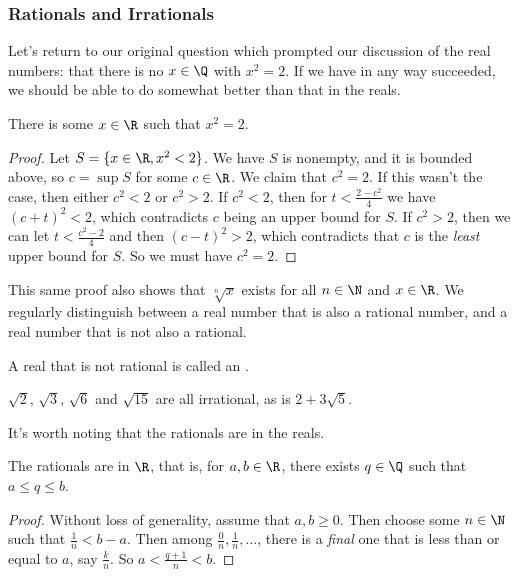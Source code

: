 \subsubsection{Rationals and Irrationals}

Let's return to our original question which prompted our discussion of the real numbers: that there is no $x \in \Q$ with $x^2 = 2$. If we have in any way succeeded, we should be able to do somewhat better than that in the reals. 

\begin{proposition}
	There is some $x \in \R$ such that $x^2 = 2$.
\end{proposition}
\begin{proof}
	Let $S = \{x \in \R, x^2 < 2\}$. We have $S$ is nonempty, and it is bounded above, so $c = \sup S$ for some $c \in \R$. We claim that $c^2 = 2$. If this wasn't the case, then either $c^2 < 2$ or $c^2 > 2$. If $c^2 < 2$, then for $t < \frac{2 - c^2}{4}$ we have $(c + t)^2 < 2$, which contradicts $c$ being an upper bound for $S$. If $c^2 > 2$, then we can let $t < \frac{c^2 - 2}{4}$ and then $(c - t)^2 > 2$, which contradicts that $c$ is the \emph{least} upper bound for $S$. So we must have $c^2 = 2$.
\end{proof}

This same proof also shows that $\sqrt[n]{x}$ exists for all $n \in \N$ and $x \in \R$. 
We regularly distinguish between a real number that is also a rational number, and a real number that is not also a rational.

\begin{definition}
	A real that is not rational is called an .
\end{definition}


\begin{example}
	$\sqrt{2}$, $\sqrt{3}$, $\sqrt{6}$ and $\sqrt{15}$ are all irrational, as is $2 + 3\sqrt{5}$.
\end{example}

It's worth noting that the rationals are  in the reals.

\begin{theorem}[$\Q$ is dense in $\R$]
		The rationals are  in $\R$, that is, for $a, b \in \R$, there exists $q \in \Q$ such that $a \leq q \leq b$.
\end{theorem}
\begin{proof}
	Without loss of generality, assume that $a, b \geq 0$. Then choose some $n \in \N$ such that $\frac{1}{n} < b - a$. Then among
	$\frac{0}{n}, \frac{1}{n}, \dots$, there is a \emph{final} one that is less than or equal to $a$, say $\frac{k}{n}$. So $a < \frac{q + 1}{n} < b$.
\end{proof}

